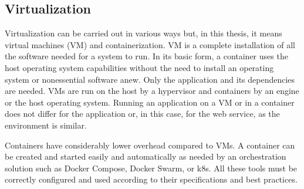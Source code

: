 \subsection{Virtualization}
\begin{sloppypar}
    Virtualization can be carried out in various ways but, in this thesis, it
    means virtual machines (VM) and containerization. VM is a complete
    installation of all the software needed for a system to run. In its basic
    form, a container uses the host operating system capabilities without the
    need to install an operating system or nonessential software anew. Only the
    application and its dependencies are needed. VMs are run on the host by a
    hypervisor and containers by an engine or the host operating system. Running
    an application on a VM or in a container does not differ for the application
    or, in this case, for the web service, as the environment is similar.
\end{sloppypar}
\begin{sloppypar}
    Containers have considerably lower overhead compared to VMs. A
    container can be created and started easily and automatically as needed by
    an orchestration solution such as Docker Compose, Docker Swarm, or k8s. All
    these tools must be correctly configured and used according to their
    specifications and best practices.
\end{sloppypar}

